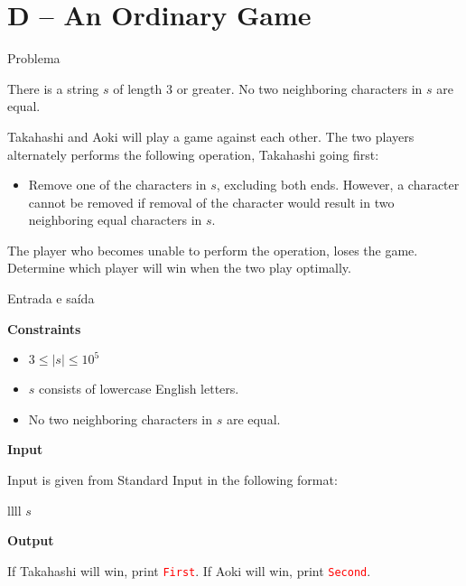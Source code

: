 \section{D -- An Ordinary Game}

\begin{frame}[fragile]{Problema}

There is a string $s$ of length 3 or greater. No two neighboring characters in $s$ are equal.

Takahashi and Aoki will play a game against each other. The two players alternately performs 
the following operation, Takahashi going first:

\begin{itemize}
    \item Remove one of the characters in $s$, excluding both ends. However, a character 
        cannot be removed if removal of the character would result in two neighboring equal 
        characters in $s$.
\end{itemize}

The player who becomes unable to perform the operation, loses the game. Determine which player 
will win when the two play optimally.

\end{frame}

\begin{frame}[fragile]{Entrada e saída}

\textbf{Constraints}

\begin{itemize}
    \item $3\leq |s|\leq 10^5$
    \item $s$ consists of lowercase English letters.
    \item No two neighboring characters in $s$ are equal. 
\end{itemize}

\textbf{Input}

Input is given from Standard Input in the following format:
\begin{atcoderio}{llll}
$s$ \\
\end{atcoderio}

\textbf{Output}

If Takahashi will win, print \texttt{\textcolor{red}{First}}. If Aoki will win, print 
\texttt{\textcolor{red}{Second}}.

\end{frame}

